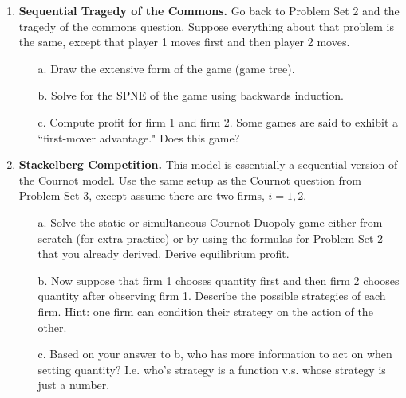 \documentclass{article}
\begin{document}
\begin{enumerate}
    
    \item \textbf{Sequential Tragedy of the Commons.} Go back to Problem Set 2 and the tragedy of the commons question. Suppose everything about that problem is the same, except that player 1 moves first and then player 2 moves.
    \begin{enumerate}
        \item[a.] Draw the extensive form of the game (game tree).
        
        \vspace{6cm}
        
        \item[b.] Solve for the SPNE of the game using backwards induction.
        
        \vspace{6cm}
        
        \item[c.] Compute profit for firm 1 and firm 2. Some games are said to exhibit a ``first-mover advantage." Does this game?
        
        \vspace{4cm}
        
    \end{enumerate}
    
    \item \textbf{Stackelberg Competition.} This model is essentially a sequential version of the Cournot model. Use the same setup as the Cournot question from Problem Set 3, except assume there are two firms, $i=1,2$.
    \begin{enumerate}
        \item[a.] Solve the static or simultaneous Cournot Duopoly game either from scratch (for extra practice) or by using the formulas for Problem Set 2 that you already derived. Derive equilibrium profit.
        
        \vspace{6cm}
        
        \item[b.] Now suppose that firm 1 chooses quantity first and then firm 2 chooses quantity after observing firm 1. Describe the possible strategies of each firm. Hint: one firm can condition their strategy on the action of the other.
        
        \vspace{3cm}
        
        \item[c.] Based on your answer to b, who has more information to act on when setting quantity? I.e. who's strategy is a function v.s. whose strategy is just a number.
        

\end{enumerate}
\end{enumerate}
\end{document}
